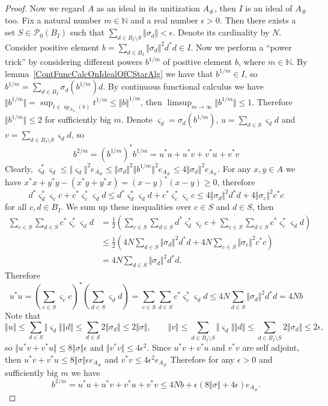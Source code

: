 \begin{proof}
Now we regard $A$ as an ideal in its unitization $A_\#$, then $I$ is an ideal of
$A_\#$ too. Fix a natural number $m\in\mathbb{N}$ and a real number
$\epsilon>0$. Then there exists a set $S\in\mathcal{P}_0(B_I)$ such that
$\sum_{d\in B_I\setminus S}\Vert\sigma_d\Vert<\epsilon$. Denote its cardinality
by $N$. Consider positive element 
$b=\sum_{d\in B_I}\Vert\sigma_d\Vert^2 d^*d\in I$. Now we perform 
a ``power trick'' by considering different powers $b^{1/m}$ of positive element 
$b$, where $m\in\mathbb{N}$. By lemma~\ref{ContFuncCalcOnIdealOfCStarAlg} we 
have that $b^{1/m}\in I$, so $b^{1/m}=\sum_{d\in B_I}\sigma_d(b^{1/m})d$. 
By continuous functional calculus we have 
$\Vert b^{1/m}\Vert
=\sup_{t\in\operatorname{sp}_{A_\#}(b)} t^{1/m}\leq\Vert b\Vert^{1/m}$, 
then $\limsup_{m\to\infty}\Vert b^{1/m}\Vert\leq 1$. 
Therefore $\Vert b^{1/m}\Vert\leq 2$ for sufficiently big $m$. Denote
$\varsigma_d=\sigma_d(b^{1/m})$, $u=\sum_{d\in S}\varsigma_d d$ and
$v=\sum_{d\in B_I\setminus S}\varsigma_d d$, so 
$$
b^{2/m}={(b^{1/m})}^*b^{1/m}=u^*u+u^*v+v^*u+v^*v
$$
Clearly, $\varsigma_d^*\varsigma_d\leq \Vert \varsigma_d\Vert^2 e_{A_\#}\leq
\Vert \sigma_d\Vert^2\Vert b^{1/m}\Vert^2 e_{A_\#}\leq 4\Vert \sigma_d\Vert^2
e_{A_\#}$. For any $x,y\in A$ we have $x^*x+y^*y-(x^*y+y^*x)={(x-y)}^*(x-y)\geq
0$, therefore 
$$
d^*\varsigma_d^* \varsigma_c c+c^*\varsigma_c^* \varsigma_d d
\leq d^*\varsigma_d^*\varsigma_d d + c^*\varsigma_c^*\varsigma_c c
\leq 4\Vert \sigma_d\Vert^2 d^*d+4\Vert \sigma_c\Vert^2 c^*c
$$
for all $c,d\in B_I$. We sum up these inequalities over $c\in S$ and $d\in S$,
then 
$$
\begin{aligned}
\sum_{c\in S}\sum_{d\in S}c^*\varsigma_c^* \varsigma_d d
&=\frac{1}{2}\left(
    \sum_{c\in S}\sum_{d\in S}d^*\varsigma_d^* \varsigma_c c
    +
    \sum_{c\in S}\sum_{d\in S}c^*\varsigma_c^* \varsigma_d d
\right)\\
&\leq\frac{1}{2}\left(4 N\sum_{d\in S} \Vert \sigma_d\Vert^2 d^*d+
4 N\sum_{c\in S} \Vert \sigma_c\Vert^2 c^*c\right)\\
&=4 N\sum_{d\in S} \Vert \sigma_d\Vert^2 d^*d.
\end{aligned}
$$
Therefore
$$
u^*u
={\left(\sum_{c\in S}\varsigma_c c\right)}^*
\left(\sum_{d\in S}\varsigma_d d\right)
=\sum_{c\in S}\sum_{d\in S}c^*\varsigma_c^* \varsigma_d d
\leq 4N\sum_{d\in S} \Vert \sigma_d\Vert^2 d^*d
= 4N b
$$
Note that
$$
\Vert u\Vert
\leq \sum_{d\in S}\Vert\varsigma_d\Vert\Vert d\Vert
\leq \sum_{d\in S}2\Vert\sigma_d\Vert
\leq 2\Vert\sigma\Vert,
\qquad
\Vert v\Vert
\leq \sum_{d\in B_I\setminus S}\Vert\varsigma_d\Vert\Vert d\Vert
\leq \sum_{d\in B_I\setminus S}2\Vert\sigma_d\Vert
\leq 2\epsilon,
$$
so $\Vert u^*v+v^*u\Vert\leq 8\Vert\sigma\Vert\epsilon$ 
and $\Vert v^*v\Vert\leq 4\epsilon^2$. Since $u^*v+v^*u$ and $v^*v$ are self 
adjoint, then $u^*v+v^*u\leq 8\Vert\sigma\Vert\epsilon e_{A_\#}$ 
and $v^*v\leq 4\epsilon^2 e_{A_\#}$ Therefore for any $\epsilon>0$ and 
sufficiently big $m$ we have 
$$
b^{2/m}
=u^*u+u^*v+v^*u+v^*v
\leq 4Nb+\epsilon(8\Vert\sigma\Vert+4\epsilon)e_{A_\#}.
$$



\end{proof}
